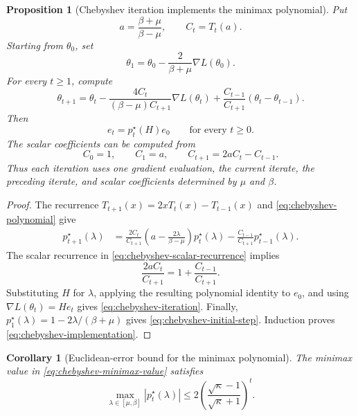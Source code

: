 \documentclass[11pt,twoside]{article}
\newtheorem{proposition}[theorem]{Proposition}
\newtheorem{corollary}[theorem]{Corollary}
\theoremstyle{definition}
\theoremstyle{remark}
\begin{document}
\begin{proposition}[Chebyshev iteration implements the minimax polynomial]
\label{prop:chebyshev-implementation}
Put
\[
 a=\frac{\beta+\mu}{\beta-\mu},
 \qquad C_t=T_t(a).
\]
Starting from $\theta_0$, set
\begin{equation}
 \theta_1
 =\theta_0-\frac{2}{\beta+\mu}\nabla L(\theta_0).
 \label{eq:chebyshev-initial-step}
\end{equation}
For every $t\ge1$, compute
\begin{equation}
 \theta_{t+1}
 =\theta_t
  -\frac{4C_t}{(\beta-\mu)C_{t+1}}\nabla L(\theta_t)
  +\frac{C_{t-1}}{C_{t+1}}(\theta_t-\theta_{t-1}).
 \label{eq:chebyshev-iteration}
\end{equation}
Then
\begin{equation}
 e_t=p_t^\star(H)e_0
 \qquad\text{for every }t\ge0.
 \label{eq:chebyshev-implementation}
\end{equation}
The scalar coefficients can be computed from
\begin{equation}
 C_0=1,\qquad C_1=a,\qquad C_{t+1}=2aC_t-C_{t-1}.
 \label{eq:chebyshev-scalar-recurrence}
\end{equation}
Thus each iteration uses one gradient evaluation, the current iterate, the
preceding iterate, and scalar coefficients determined by $\mu$ and $\beta$.
\end{proposition}

\begin{proof}
The recurrence $T_{t+1}(x)=2xT_t(x)-T_{t-1}(x)$ and
\cref{eq:chebyshev-polynomial} give
\begin{align*}
 p_{t+1}^\star(\lambda)
 &=\frac{2C_t}{C_{t+1}}
   \left(a-\frac{2\lambda}{\beta-\mu}\right)p_t^\star(\lambda)
   -\frac{C_{t-1}}{C_{t+1}}p_{t-1}^\star(\lambda).
\end{align*}
The scalar recurrence in \cref{eq:chebyshev-scalar-recurrence} implies
\[
 \frac{2aC_t}{C_{t+1}}
 =1+\frac{C_{t-1}}{C_{t+1}}.
\]
Substituting $H$ for $\lambda$, applying the resulting polynomial identity to
$e_0$, and using $\nabla L(\theta_t)=He_t$ gives
\cref{eq:chebyshev-iteration}. Finally,
$p_1^\star(\lambda)=1-2\lambda/(\beta+\mu)$ gives
\cref{eq:chebyshev-initial-step}. Induction proves
\cref{eq:chebyshev-implementation}.
\end{proof}

\begin{corollary}[Euclidean-error bound for the minimax polynomial]
\label{cor:chebyshev-rate}
The minimax value in \cref{eq:chebyshev-minimax-value} satisfies
\begin{equation}
 \max_{\lambda\in[\mu,\beta]}|p_t^\star(\lambda)|
 \le2\left(\frac{\sqrt\kappa-1}{\sqrt\kappa+1}\right)^t.
 \label{eq:chebyshev-rate}
\end{equation}
\end{corollary}
\end{document}
